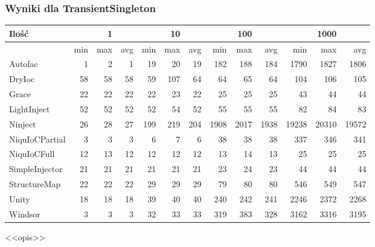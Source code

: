 \documentclass[12pt]{article}
\begin{document}
\subsubsection{Wyniki dla TransientSingleton}
\begin{center}
\begin{small}
	\begin{tabular}{ | l | r r r | r r r | r r r | r r r | }
    		\hline
     		Ilość & & 1 & & & 10 & & & 100 & & & 1000 & \\ \hline
     		 & min & max & avg & min & max & avg & min & max & avg & min & max & avg \\ \hline
    		Autofac & 1 & 2 & 1 & 19 & 20 & 19 & 182 & 188 & 184 & 1790 & 1827 & 1806 \\ \hline
		DryIoc & 58 & 58 & 58 & 59 & 107 & 64 & 64 & 65 & 64 & 104 & 106 & 105 \\ \hline
		Grace & 22 & 22 & 22 & 22 & 23 & 22 & 25 & 25 & 25 & 43 & 44 & 44 \\ \hline
		LightInject & 52 & 52 & 52 & 52 & 54 & 52 & 55 & 55 & 55 & 82 & 84 & 83 \\ \hline
		Ninject & 26 & 28 & 27 & 199 & 219 & 204 & 1908 & 2017 & 1938 & 19238 & 20310 & 19572 \\ \hline
		NiquIoCPartial & 3 & 3 & 3 & 6 & 7 & 6 & 38 & 38 & 38 & 337 & 346 & 341 \\ \hline
		NiquIoCFull & 12 & 13 & 12 & 12 & 12 & 12 & 13 & 14 & 13 & 25 & 25 & 25 \\ \hline
		SimpleInjector & 21 & 21 & 21 & 21 & 21 & 21 & 23 & 24 & 23 & 44 & 44 & 44 \\ \hline
		StructureMap & 22 & 22 & 22 & 29 & 29 & 29 & 79 & 80 & 80 & 546 & 549 & 547 \\ \hline
		Unity & 18 & 18 & 18 & 39 & 40 & 40 & 240 & 242 & 241 & 2246 & 2372 & 2268 \\ \hline
		Windsor & 3 & 3 & 3 & 32 & 33 & 33 & 319 & 383 & 328 & 3162 & 3316 & 3195 \\
    		\hline
  	\end{tabular}
\end{small}
\end{center}
<<opis>>
\end{document}
